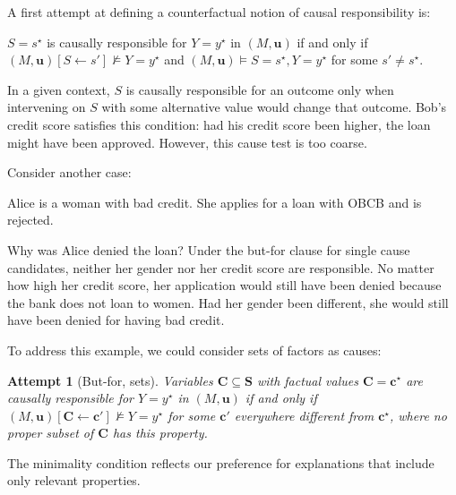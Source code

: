\documentclass[anon,12pt]{clear2026} %
\newtheorem{attempt}{Attempt}
\begin{document}
A first attempt at defining a counterfactual notion of causal responsibility is:
\begin{definition}
$S=s^\star$ is causally responsible for  $Y=y^\star$  in $(M, \mathbf{u})$ if and only if $(M, \mathbf{u})[S \leftarrow s'] \not \models Y=y^\star$ and  $(M, \mathbf{u}) \models S=s^\star, Y=y^\star$ for some $s' \neq s^\star$.
\end{definition}

\noindent 
In a given context, $S$ is causally responsible for an outcome only when intervening on $S$ with some alternative value would change that outcome. 
Bob’s credit score satisfies this condition: had his credit score been higher, the loan might have been approved. 
However, this cause test is too coarse.

Consider another case:
\begin{example} 
Alice is a woman with bad credit.
She applies for a loan with OBCB and is rejected.
\end{example}
\noindent Why was Alice denied the loan?
Under the but-for clause for single cause candidates, neither her gender nor her credit score are responsible.
No matter how high her credit score, her application would still have been denied because the bank does not loan to women.
Had her gender been different, she would still have been denied for having bad credit.

To address this example, we could consider sets of factors as causes:
\begin{attempt}[But-for, sets]
Variables $\mathbf{C}\subseteq \mathbf{S}$ with factual values $\mathbf{C} = \mathbf{c}^\star$ are causally responsible for $Y = y^\star$ in $(M, \mathbf{u})$ if and only if $(M, \mathbf{u})[\mathbf{C} \leftarrow \mathbf{c'}] \not \models Y= y ^\star$ for some $\mathbf{c'}$ everywhere different from $\mathbf{c}^\star$, where no proper subset of $\mathbf{C}$ has this property. 
\end{attempt}

\noindent The minimality condition reflects our preference for explanations that include only relevant properties.
\end{document}

